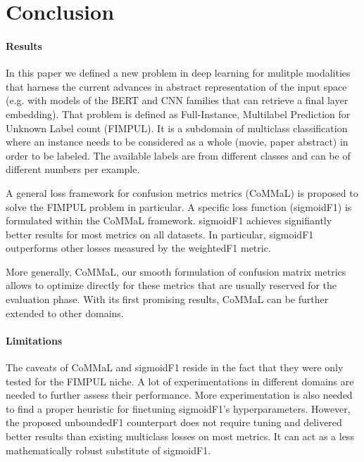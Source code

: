 
\section{Conclusion}
\label{sec:orged3d8a1}

\paragraph{Results}
In this paper we defined a new problem in deep learning for mulitple modalities that harness the current advances in abstract representation of the input space (e.g. with models of the BERT and CNN families that can retrieve a final layer embedding). That problem is defined as Full-Instance, Multilabel Prediction for Unknown Label count (FIMPUL). It is a subdomain of multiclass classification where an instance needs to be considered as a whole (movie, paper abstract) in order to be labeled. The available labels are from different classes and can be of different numbers per example.

A general loss framework for confusion metrics metrics (CoMMaL) is proposed to solve the FIMPUL problem in particular. A specific loss function (sigmoidF1) is formulated within the CoMMaL framework. sigmoidF1 achieves signifiantly better results for most metrics on all datasets. In particular, sigmoidF1 outperforms other losses measured by the weightedF1 metric.

More generally, CoMMaL, our smooth formulation of confusion matrix metrics allows to optimize directly for these metrics that are usually reserved for the evaluation phase. With its first promising results, CoMMaL can be further extended to other domains.

\paragraph{Limitations}
The caveats of CoMMaL and sigmoidF1 reside in the fact that they were only tested for the FIMPUL niche. A lot of experimentations in different domains are needed to further assess their performance. More experimentation is also needed to find a proper heuristic for finetuning sigmoidF1's hyperparameters. However, the proposed unboundedF1 counterpart does not require tuning and delivered better results than existing multiclass losses on most metrics. It can act as a less mathematically robust substitute of sigmoidF1.

